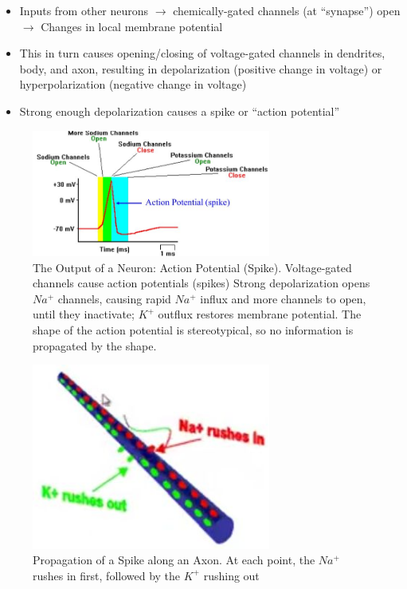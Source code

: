 \documentclass[]{article}
\begin{document}
\begin{itemize}
	\item Inputs from other neurons $\rightarrow$ 	chemically-gated channels (at
	``synapse'') open  $\rightarrow$ Changes in local membrane potential
	\item This in turn causes opening/closing 	of voltage-gated channels in 	dendrites, body, and axon, resulting 	in depolarization (positive change 	in voltage) or hyperpolarization	(negative change in voltage)
	\item Strong enough depolarization	causes a spike or “action potential”
\end{itemize}

\begin{figure}[H]
	\caption[The Output of a Neuron: Action Potential (Spike)]{The Output of a Neuron: Action Potential (Spike). Voltage-gated channels cause action potentials (spikes) Strong depolarization opens $Na^+$ channels, causing rapid $Na^+$ influx and more channels to open, until they inactivate; $K^+$ outflux restores membrane potential. The shape of the action potential is stereotypical, so no information is propagated by the shape.}
	\includegraphics[width=0.7\textwidth]{action-potential}
\end{figure}

\begin{figure}[H]
	\caption[Propagation of a Spike along an Axon]{Propagation of a Spike along an Axon. At each point, the $Na^+$ rushes in first, followed by the $K^+$ rushing out\cite{krantz2000PsychScholar}}
	\includegraphics[width=0.7\textwidth]{propagation1}
\end{figure}
\end{document}

